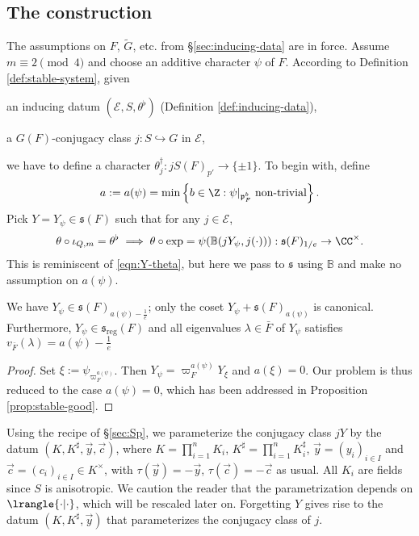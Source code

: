 \documentclass[a4paper,10pt]{article}
\begin{document}
\subsection{The construction}\label{sec:ss-construction}
The assumptions on $F$, $\tilde{G}$, etc. from \S\ref{sec:inducing-data} are in force. Assume $m \equiv 2 \pmod 4$ and choose an additive character $\psi$ of $F$. According to Definition \ref{def:stable-system}, given
\begin{compactitem}
	\item an inducing datum $(\mathcal{E}, S, \theta^\flat)$ (Definition \ref{def:inducing-data}),
	\item a $G(F)$-conjugacy class $j: S \hookrightarrow G$ in $\mathcal{E}$,
\end{compactitem}
we have to define a character $\theta_j^\dagger: jS(F)_{p'} \to \{\pm 1\}$. To begin with, define
\begin{equation}\label{eqn:a}
	a := a(\psi) = \min\left\{ b \in \Z: \psi|_{\mathfrak{p}_F^b} \; \text{non-trivial} \right\}.
\end{equation}
Pick $Y = Y_\psi \in \mathfrak{s}(F)$ such that for any $j \in \mathcal{E}$,
\begin{equation}\label{eqn:Y-theta-2}
	\theta \circ \iota_{Q,m} = \theta^\flat \implies \theta \circ \exp = \psi(\mathbb{B}(jY_\psi , j(\cdot))): \mathfrak{s}(F)_{1/e} \to \CC^\times.
\end{equation}
This is reminiscent of \eqref{eqn:Y-theta}, but here we pass to $\mathfrak{s}$ using $\mathbb{B}$ and make no assumption on $a(\psi)$.

\begin{lemma}\label{prop:stable-good-2}
	We have $Y_\psi \in \mathfrak{s}(F)_{a(\psi) - \frac{1}{e}}$; only the coset $Y_\psi + \mathfrak{s}(F)_{a(\psi)}$ is canonical. Furthermore, $Y_\psi \in \mathfrak{s}_{\mathrm{reg}}(F)$ and all eigenvalues $\lambda \in \bar{F}$ of $Y_\psi$ satisfies $v_{\bar{F}}(\lambda) = a(\psi) - \frac{1}{e}$
\end{lemma}
\begin{proof}
	Set $\xi := \psi_{\varpi_F^{a(\psi)}}$. Then $Y_\psi = \varpi_F^{a(\psi)} Y_\xi$ and $a(\xi)=0$. Our problem is thus reduced to the case $a(\psi)=0$, which has been addressed in Proposition \ref{prop:stable-good}.
\end{proof}

Using the recipe of \S\ref{sec:Sp}, we parameterize the conjugacy class $jY$ by the datum $(K, K^\sharp, \vec{y}, \vec{c})$, where $K = \prod_{i=1}^n K_i$, $K^\sharp = \prod_{i=1}^n K_i^\sharp$, $\vec{y} = (y_i)_{i \in I}$ and $\vec{c} = (c_i)_{i \in I} \in K^\times$, with $\tau(\vec{y}) = -\vec{y}$, $\tau(\vec{c}) = -\vec{c}$ as usual. All $K_i$ are fields since $S$ is anisotropic. We caution the reader that the parametrization depends on $\lrangle{\cdot|\cdot}$, which will be rescaled later on. Forgetting $Y$ gives rise to the datum $(K, K^\sharp, \vec{y})$ that parameterizes the conjugacy class of $j$.
\end{document}

